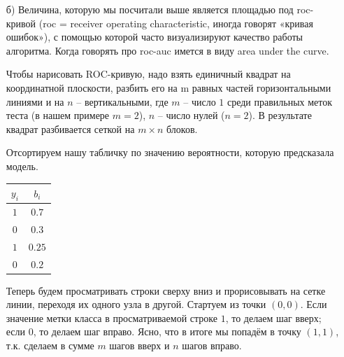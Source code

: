 \documentclass[12pt, a4paper, oneside]{article}
\begin{document}
{\begin{enumerate}
\begin{equation} 
\begin{aligned}
& 0.7 > 0.2 \qquad & ok \\
& 0.7 > 0.3 \qquad & ok \\
& 0.25 > 0.2 \qquad & ok \\ 
& 0.25 < 0.3 \qquad & not \mbox{ } ok \\
\end{aligned}
\end{equation} 

Видим, что модель ошиблась в упорядочивании один раз. $roc_auc$ --- это доля пар, где модель оказалась права. В нашем случае это $0.75$. $roc_auc$ принимает значения от $0.5$ до $1$, если её значения близки к $0.5$, наш алгоритм ничем не лучше монетки, потому что он упорядочивает пары из унывших и нормальных абы как. 

Такая метрика позволяет не привязываться к конкретному значению порога и видеть насколько классно у модели выходит упорядочивать пары объектов. 

\item[б)]  Величина, которую мы посчитали выше является площадью под roc-кривой (roc = receiver operating characteristic, иногда говорят «кривая ошибок»), с помощью которой часто визуализируют качество работы алгоритма.  Когда говорять про roc-auc имется в виду area under the curve. 

Чтобы нарисовать ROC-кривую, надо взять единичный квадрат на координатной плоскости, разбить его на m равных частей горизонтальными линиями и на $n$ – вертикальными, где $m$ – число $1$ среди правильных меток теста (в нашем примере $m=2$), $n$ – число нулей ($n=2$). В результате квадрат разбивается сеткой на $m \times n$ блоков.

Отсортируем нашу табличку по значению вероятности, которую предсказала модель. 

\begin{center}
	\begin{tabular}{c|c}
		$y_i$ & $b_i$ \\
		\hline
		$1$  & $0.7$ \\
		$0$ & $0.3$ \\
		$1$ & $0.25$ \\
		$0$ & $0.2$ \\
	\end{tabular}
\end{center}

Теперь будем просматривать строки сверху вниз и прорисовывать на сетке линии, переходя их одного узла в другой. Стартуем из точки $(0, 0)$. Если значение метки класса в просматриваемой строке $1$, то делаем шаг вверх; если $0$, то делаем шаг вправо. Ясно, что в итоге мы попадём в точку $(1, 1)$, т.к. сделаем в сумме $m$ шагов вверх и $n$ шагов вправо.



\end{enumerate}}
\end{document}

